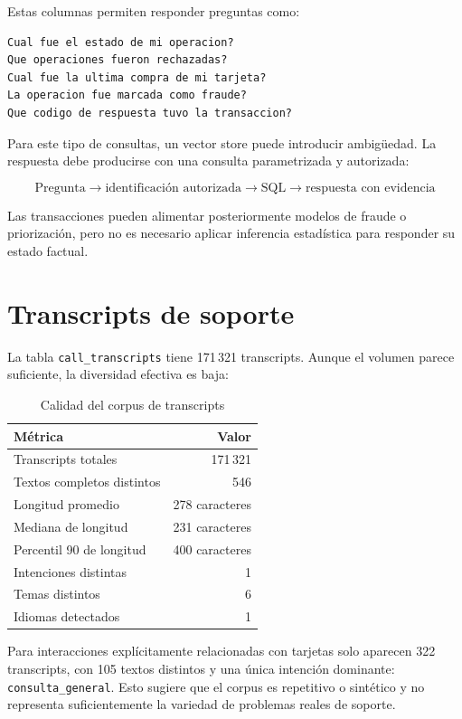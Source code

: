 \documentclass[11pt,a4paper]{article}
\begin{document}
Estas columnas permiten responder preguntas como:

\begin{lstlisting}
Cual fue el estado de mi operacion?
Que operaciones fueron rechazadas?
Cual fue la ultima compra de mi tarjeta?
La operacion fue marcada como fraude?
Que codigo de respuesta tuvo la transaccion?
\end{lstlisting}

Para este tipo de consultas, un vector store puede introducir ambigüedad. La respuesta debe producirse con una consulta parametrizada y autorizada:

\[
\text{Pregunta} \rightarrow \text{identificación autorizada} \rightarrow \text{SQL} \rightarrow \text{respuesta con evidencia}
\]

Las transacciones pueden alimentar posteriormente modelos de fraude o priorización, pero no es necesario aplicar inferencia estadística para responder su estado factual.

\section{Transcripts de soporte}

La tabla \texttt{call\_transcripts} tiene 171\,321 transcripts. Aunque el volumen parece suficiente, la diversidad efectiva es baja:

\begin{table}[ht]
\centering
\caption{Calidad del corpus de transcripts}
\begin{tabularx}{\textwidth}{>{\raggedright\arraybackslash}p{} r}
\toprule
Métrica & Valor \\
\midrule
Transcripts totales & 171\,321 \\
Textos completos distintos & 546 \\
Longitud promedio & 278 caracteres \\
Mediana de longitud & 231 caracteres \\
Percentil 90 de longitud & 400 caracteres \\
Intenciones distintas & 1 \\
Temas distintos & 6 \\
Idiomas detectados & 1 \\
\bottomrule
\end{tabularx}
\end{table}

Para interacciones explícitamente relacionadas con tarjetas solo aparecen 322 transcripts, con 105 textos distintos y una única intención dominante: \texttt{consulta\_general}. Esto sugiere que el corpus es repetitivo o sintético y no representa suficientemente la variedad de problemas reales de soporte.
\end{document}
